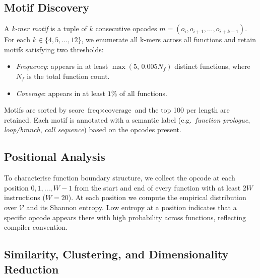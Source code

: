 \documentclass[10pt,twocolumn]{article}
\begin{document}
\subsection{Motif Discovery}

A \emph{k-mer motif} is a tuple of $k$ consecutive opcodes
$m = (o_i, o_{i+1}, \ldots, o_{i+k-1})$.  For each $k \in \{4,5,\ldots,12\}$,
we enumerate all k-mers across all functions and retain motifs satisfying two
thresholds:
\begin{itemize}
  \item \emph{Frequency}: appears in at least $\max(5,\, 0.005 N_f)$ distinct
        functions, where $N_f$ is the total function count.
  \item \emph{Coverage}: appears in at least $1\%$ of all functions.
\end{itemize}
Motifs are sorted by score $\text{freq} \times \text{coverage}$ and the top 100
per length are retained.  Each motif is annotated with a semantic label
(e.g.\ \emph{function prologue}, \emph{loop/branch}, \emph{call sequence})
based on the opcodes present.

\subsection{Positional Analysis}

To characterise function boundary structure, we collect the opcode at each
position $0, 1, \ldots, W-1$ from the start and end of every function with at
least $2W$ instructions ($W = 20$).  At each position we compute the empirical
distribution over $\mathcal{V}$ and its Shannon entropy.  Low entropy at a
position indicates that a specific opcode appears there with high probability
across functions, reflecting compiler convention.

\subsection{Similarity, Clustering, and Dimensionality Reduction}
\end{document}
